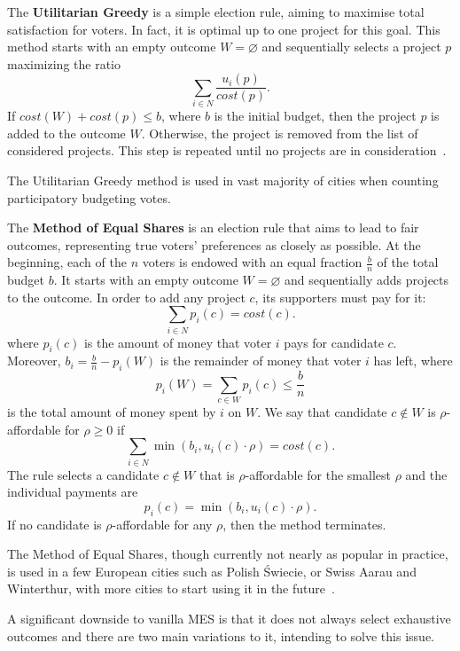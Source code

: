 \begin{definition}
The \textbf{Utilitarian Greedy} is a simple election rule, aiming to maximise total satisfaction for voters. In fact, it is optimal up to one project for this goal. This method starts with an empty outcome $W=\varnothing$ and sequentially selects a project $p$ maximizing the ratio
$$
\sum_{i\in N}\frac{u_i(p)}{cost(p)}.
$$
If $cost(W)+cost(p)\le b$, where $b$ is the initial budget, then the project $p$ is added to the outcome $W$. Otherwise, the project is removed from the list of considered projects. This step is repeated until no projects are in consideration~\cite{DataToolsAndPB}. 
\end{definition}
The Utilitarian Greedy method is used in vast majority of cities when counting participatory budgeting votes.

\begin{definition}
The \textbf{Method of Equal Shares} is an election rule that aims to lead to fair outcomes, representing true voters' preferences as closely as possible. At the beginning, each of the $n$ voters is endowed with an equal fraction $\frac{b}{n}$ of the total budget $b$. It starts with an empty outcome $W=\varnothing$ and sequentially adds projects to the outcome. In order to add any project $c$, its supporters must pay for it: 
$$
\sum_{i \in N}p_i(c)=cost(c).
$$ 
where $p_i(c)$ is the amount of money that voter $i$ pays for candidate $c$. Moreover, $b_i=\frac{b}{n}-p_i(W)$ is the remainder of money that voter $i$ has left, where 
$$
p_i(W)=\sum_{c\in W}p_i(c)\le \frac{b}{n}
$$
is the total amount of money spent by $i$ on $W$. We say that candidate $c\notin W$ is $\rho$-affordable for $\rho \ge 0$ if
$$
\sum_{i\in N}\min(b_i, u_i(c)\cdot \rho)=cost(c).
$$
The rule selects a candidate $c\notin W$ that is $\rho$-affordable for the smallest $\rho$ and the individual payments are
$$
p_i(c)=\min(b_i, u_i(c)\cdot \rho).
$$
If no candidate is $\rho$-affordable for any $\rho$, then the method terminates.
\end{definition}
The Method of Equal Shares, though currently not nearly as popular in practice, is used in a few European cities such as Polish Świecie, or Swiss Aarau and Winterthur, with more cities to start using it in the future~\cite{EqualSharesWebsite}.

A significant downside to vanilla MES is that it does not always select exhaustive outcomes and there are two main variations to it, intending to solve this issue. 


